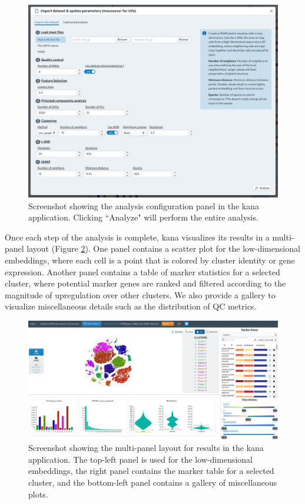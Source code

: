 \documentclass{article}
\begin{document}
\begin{figure}[htbp]
\begin{center}
\includegraphics[width=\textwidth]{screenshots/analysis.png}
\end{center}
\caption{Screenshot showing the analysis configuration panel in the kana application.
Clicking ``Analyze" will perform the entire analysis.}
\label{screenshot:analysis}
\end{figure}

Once each step of the analysis is complete, kana visualizes its results in a multi-panel layout (Figure \ref{screenshot:results}).
One panel contains a scatter plot for the low-dimensional embeddings, where each cell is a point that is colored by cluster identity or gene expression.
Another panel contains a table of marker statistics for a selected cluster, where potential marker genes are ranked and filtered according to the magnitude of upregulation over other clusters.
We also provide a gallery to visualize miscellaneous details such as the distribution of QC metrics.

\begin{figure}[htbp]
\begin{center}
\includegraphics[width=\textwidth]{screenshots/results.png}
\end{center}
\caption{Screenshot showing the multi-panel layout for results in the kana application.
The top-left panel is used for the low-dimensional embeddings,
the right panel contains the marker table for a selected cluster,
and the bottom-left panel contains a gallery of miscellaneous plots.}
\label{screenshot:results}
\end{figure}
\end{document}
